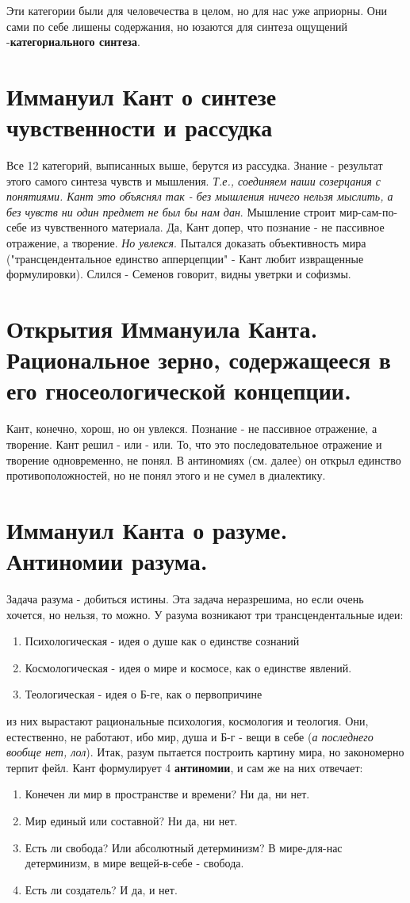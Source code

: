 Эти категории были  для человечества в целом, но для нас уже априорны. Они сами по себе лишены содержания, но юзаются для синтеза ощущений -\textbf{категориального синтеза}.

\section{Иммануил Кант о синтезе чувственности и рассудка}
Все 12 категорий, выписанных выше, берутся из рассудка. Знание - результат этого самого синтеза чувств и мышления. \textit{Т.е., соединяем наши созерцания с понятиями. Кант это объяснял так - без мышления ничего нельзя мыслить, а без чувств ни один предмет не был бы нам дан}. Мышление строит мир-сам-по-себе из чувственного материала. Да, Кант допер, что познание - не пассивное отражение, а творение. \textit{Но увлекся}. Пытался доказать объективность мира ("трансцендентальное единство апперцепции" - Кант любит извращенные формулировки). Слился  - Семенов говорит, видны уветрки и софизмы.

\section{Открытия Иммануила Канта. Рациональное зерно, содержащееся в его гносеологической концепции.}
Кант, конечно, хорош, но он увлекся. Познание - не пассивное отражение, а творение. Кант решил - или - или. То, что это последовательное отражение и творение одновременно, не понял.  В антиномиях (см. далее) он открыл единство противоположностей, но не понял этого и не сумел в диалектику.

\section{Иммануил Канта о разуме. Антиномии разума.}
Задача разума - добиться истины. Эта задача неразрешима, но если очень хочется, но нельзя, то можно. У разума возникают три трансцендентальные идеи:
\begin{enumerate}
\item Психологическая - идея о душе как о единстве сознаний
\item Космологическая - идея о мире и космосе, как о единстве явлений.
\item Теологическая - идея о Б-ге, как о первопричине
\end{enumerate}
из них вырастают рациональные психология, космология и теология. Они, естественно, не работают, ибо мир, душа и Б-г - вещи в себе (\textit{а последнего вообще нет, лол}).
Итак, разум пытается построить картину мира, но закономерно терпит фейл. Кант формулирует 4 \textbf{антиномии}, и сам же на них отвечает:
\begin{enumerate}
\item Конечен ли мир в пространстве и времени? Ни да, ни нет.
\item Мир единый или составной? Ни да, ни нет.
\item Есть ли свобода? Или абсолютный детерминизм? В мире-для-нас детерминизм, в мире вещей-в-себе - свобода. 
\item Есть ли создатель? И да, и нет.
\end{enumerate}

